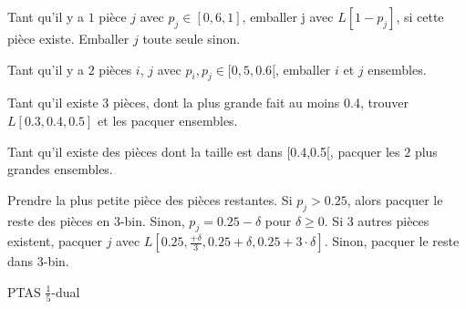 \documentclass[a4paper,12pt]{report}
\theoremstyle{plain}				%
\theoremstyle{definition}				%
\begin{document}
\begin{algorithm}[H]
\DontPrintSemicolon

Tant qu'il y a $1$ pièce $j$ avec $p_j \in [0,6, 1]$, emballer j avec
$L[1 - p_j]$, si cette pièce existe.
Emballer $j$ toute seule sinon.

\BlankLine %
Tant qu'il y a $2$ pièces $i$, $j$ avec $p_i, p_j \in [0,5, 0.6[$,
emballer $i$ et $j$ ensembles.

\BlankLine %
Tant qu'il existe $3$ pièces, dont la plus grande fait au moins 0.4,
trouver $L[0.3,0.4,0.5]$ et les pacquer ensembles.

\BlankLine %
Tant qu'il existe des pièces dont la taille est dans [0.4,0.5[, pacquer
les $2$ plus grandes ensembles.

\BlankLine %
Prendre la plus petite pièce des pièces restantes. Si $p_j > 0.25$,
alors pacquer le reste des pièces en 3-bin.
Sinon, $p_j = 0.25 - \delta$ pour $\delta \geq 0$.
Si $3$ autres pièces existent, pacquer $j$
 avec $L[0.25, \frac{+\delta}{3}, 0.25 + \delta, 0.25 + 3 \cdot \delta]$.
Sinon, pacquer le reste dans 3-bin.


\caption{PTAS $\frac{1}{5}$-dual}
\label{algo:PTASDual1_5}
\end{algorithm}

\bigskip
\end{document}
